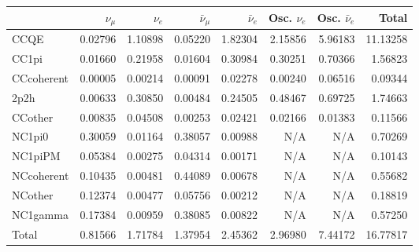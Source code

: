 \begin{table}
	\centering
	\begin{tabular} { | l ||r | r | r | r | r | r | | r | }
	\hline
	              & $\nu_\mu$            & $\nu_e$              & $\bar{\nu}_{\mu}$    & $\bar{\nu}_{e}$      & Osc. $\nu_e$         & Osc. $\bar{\nu}_{e}$ & Total                \\ \hline\hline
	 CCQE         & 0.02796              & 1.10898              & 0.05220              & 1.82304              & 2.15856              & 5.96183              & 11.13258             \\ \hline
	 CC1pi        & 0.01660              & 0.21958              & 0.01604              & 0.30984              & 0.30251              & 0.70366              & 1.56823              \\ \hline
	 CCcoherent   & 0.00005              & 0.00214              & 0.00091              & 0.02278              & 0.00240              & 0.06516              & 0.09344              \\ \hline
	 2p2h         & 0.00633              & 0.30850              & 0.00484              & 0.24505              & 0.48467              & 0.69725              & 1.74663              \\ \hline
	 CCother      & 0.00835              & 0.04508              & 0.00253              & 0.02421              & 0.02166              & 0.01383              & 0.11566              \\ \hline
	 NC1pi0       & 0.30059              & 0.01164              & 0.38057              & 0.00988              & N/A                  & N/A                  & 0.70269              \\ \hline
	 NC1piPM      & 0.05384              & 0.00275              & 0.04314              & 0.00171              & N/A                  & N/A                  & 0.10143              \\ \hline
	 NCcoherent   & 0.10435              & 0.00481              & 0.44089              & 0.00678              & N/A                  & N/A                  & 0.55682              \\ \hline
	 NCother      & 0.12374              & 0.00477              & 0.05756              & 0.00212              & N/A                  & N/A                  & 0.18819              \\ \hline
	 NC1gamma     & 0.17384              & 0.00959              & 0.38085              & 0.00822              & N/A                  & N/A                  & 0.57250              \\ \hline
	\hline
	 Total        & 0.81566              & 1.71784              & 1.37954              & 2.45362              & 2.96980              & 7.44172              & 16.77817             \\ \hline
	

\end{tabular}
\end{table}
